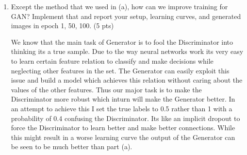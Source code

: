 \documentclass[a4paper]{article}
\theoremstyle{definition}
\newenvironment{soln}{
	\leavevmode\color{blue}\ignorespaces
}{}
\begin{document}
\begin{enumerate} [label=(\alph*)]
\begin{soln}
\begin{figure}[H]
\begin{subfigure}[b]{0.3\textwidth}
    				\caption{Epoch 100}
    			\end{subfigure}
    			\caption{Solution Generated images by $G$}
    			\label{fig:sol1b graphs}
    		\end{figure}
            \end{soln}
		
		\item Except the method that we used in (a), how can we improve training for GAN? Implement that and report your setup, learning curves, and generated images in epoch 1, 50, 100.
		\hfill (5 pts)
		
		  \begin{soln}  
                We know that the main task of Generator is to fool the Discriminator into thinking its a true sample. Due to the way neural networks work its very easy to learn certain feature relation to classify and make decisions while neglecting other features in the set. The Generator can easily exploit this issue and build a model which achieves this relation without caring about the values of the other features. Thus our major task is to make the Discriminator more robust which inturn will make the Generator better. In an attempt to achieve this I set the true labels to 0.5 rather than 1 with a probability of 0.4 confusing the Discriminator. Its like an implicit dropout to force the Discriminator to learn better and make better connections. While this might result in a worse learning curve the output of the Generator can be seen to be much better than part (a).


\end{soln}
\end{enumerate}
\end{document}
